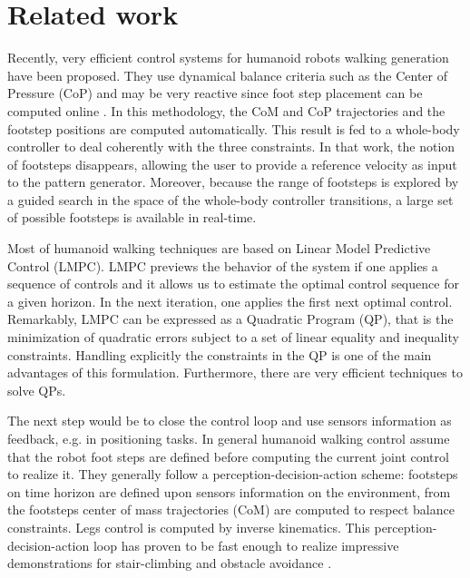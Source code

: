 
\chapter{Related work} 
\label{Chap:Related-Work}

Recently, very efficient control systems for humanoid robots walking generation have been proposed. They use dynamical balance criteria such as the Center of Pressure (CoP) and may be very reactive since foot step placement can be computed online \citep{HerdtAR2010}. In this methodology, the CoM and CoP trajectories and the footstep positions are computed automatically. This result is fed to a whole-body controller to deal coherently with the three constraints. In that work, the notion of footsteps disappears, allowing the user to provide a reference velocity as input to the pattern generator. Moreover, because the range of footsteps is explored by a guided search in the space of the whole-body controller transitions, a large set of possible footsteps is available in real-time.

Most of humanoid walking techniques are based on Linear Model Predictive Control (LMPC). LMPC previews the behavior of the system if one applies a sequence of controls and it allows us to estimate the optimal control sequence for a given horizon. In the next iteration, one applies the first next optimal control. Remarkably, LMPC can be expressed as a Quadratic Program (QP), that is the minimization of quadratic errors subject to a set of linear equality and inequality constraints.
Handling explicitly the constraints in the QP is one of the main advantages of this formulation. 
Furthermore, there are very efficient techniques to solve QPs.

The next step would be to close the control loop and use sensors information as feedback, e.g. in positioning tasks. In general humanoid walking control assume that the robot foot steps are defined before computing the current joint control to realize it. They generally follow a perception-decision-action scheme: footsteps on time horizon are defined upon sensors information on the environment, from the footsteps center of mass trajectories (CoM) are computed to respect balance constraints. Legs control is computed by inverse kinematics. This perception-decision-action loop has proven to be fast enough to realize impressive demonstrations for stair-climbing and obstacle avoidance \citep{Lorch02,Chestnutt07,Michel07,Guttmann08}. 

